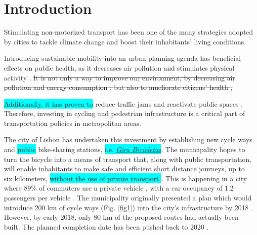 \documentclass[information,article,submit,moreauthors,Latex,dvi2pdf,10pt,a4paper]{Definitions/mdpi}
\begin{document}


\section{Introduction}

Stimulating non-motorized transport has been one of the many strategies adopted by cities to tackle climate change \cite{Banister2011} and boost their inhabitants' living conditions.
\begin{mycolorbox}[colback=cyan]
Introducing sustainable mobility into an urban planning agenda has beneficial effects on public health, as it decreases air pollution and stimulates physical activity \cite{Fraser2011,DeHartog2010,Torres2018,Carley2017,Bopp2018}. \sout{It is not only a way to improve our environment, by decreasing air pollution and energy consumption \cite{Fraser2011}; but also to ameliorate citizens' health \cite{DeHartog2010},}
\end{mycolorbox}
\colorbox{cyan}{Additionally, it has proven to} reduce traffic jams \cite{Kosha2016} and reactivate public spaces \cite{DeManuelJerez2016}. Therefore, investing in cycling and pedestrian infrastructure is a critical part of transportation policies in metropolitan areas.

The city of Lisbon has undertaken this investment by establishing new cycle ways and \colorbox{cyan}{public} bike-sharing stations, \colorbox{cyan}{i.e. \textit{\href{https://www.gira-bicicletasdelisboa.pt/}{Gira Bicicletas}}}. The municipality hopes to turn the bicycle into a means of transport that, along with public transportation, will enable inhabitants to make safe and efficient short distance journeys, up to six kilometers, \colorbox{cyan}{without the use of private transport  \cite{CamaraMunicipaldeLisboa,Marrana2018}}. This is happening in a city where 89\% of commuters use a private vehicle \cite{CamaraMunicipaldeLisboa2016}, with a car occupancy of 1.2 passengers per vehicle \cite{Silva2017}. The municipality originally presented a plan which would introduce 200 km of \lucas[new?] cycle ways (Fig. \ref{fig1}) into the city's infrastructure by 2018 \cite{Susete2016}. However, by early 2018, only 80 km of the proposed routes had actually been built. The planned completion date has been pushed back to 2020 \cite{Andre2018}.
\end{document}

